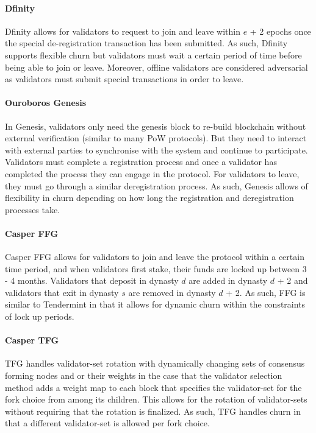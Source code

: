 \documentclass[10pt,journal,compsoc]{IEEEtran}
\begin{document}
\paragraph{Dfinity} Dfinity allows for validators to request to join and leave within $e$ + 2 epochs once the special de-registration transaction has been submitted. As such, Dfinity supports flexible churn but validators must wait a certain period of time before being able to join or leave. Moreover, offline validators are considered adversarial as validators must submit special transactions in order to leave. 

\paragraph{Ouroboros Genesis} In Genesis, validators only need the genesis block to re-build blockchain without external verification (similar to many PoW protocols). But they need to interact with external parties to synchronise with the system and continue to participate. Validators must complete a registration process and once a validator has completed the process they can engage in the protocol. For validators to leave, they must go through a similar deregistration process. As such, Genesis allows of flexibility in churn depending on how long the registration and deregistration processes take. 

\paragraph{Casper FFG} Casper FFG allows for validators to join and leave the protocol within a certain time period, and when validators first stake, their funds are locked up between 3 - 4 months. Validators that deposit in dynasty $d$ are added in dynasty $d$ + 2 and validators that exit in dynasty $s$ are removed in dynasty $d$ + 2. As such, FFG is similar to Tendermint in that it allows for dynamic churn within the constraints of lock up periods. 

\paragraph{Casper TFG} TFG handles validator-set rotation with dynamically changing sets of consensus forming nodes and or their weights in the case that the validator selection method adds a weight map to each block that specifies the validator-set for the fork choice from among its children. This allows for the rotation of validator-sets without requiring that the rotation is finalized. As such, TFG handles churn in that a different validator-set is allowed per fork choice. 
\end{document}
